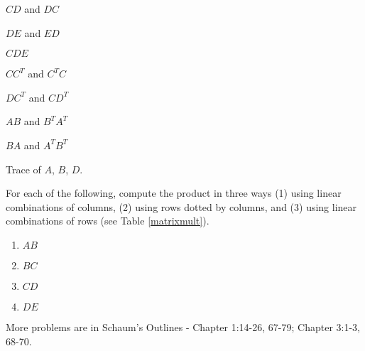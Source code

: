 \begin{enumerate}
\begin{enumerate}
\begin{multicols}{4}
	\item $CD$ and $DC$
	\item $DE$ and $ED$
	\item $CDE$
	\item $CC^T$ and $C^TC$
	\item $DC^T$ and $CD^T$
	\item $AB$ and $B^TA^T$
	\item $BA$ and $A^TB^T$
	\item Trace of $A$, $B$, $D$.	
\end{multicols}
\end{enumerate}
For each of the following, compute the product in three ways (1) using linear combinations of columns, (2) using rows dotted by columns, and (3) using linear combinations of rows (see Table \ref{matrixmult}).
\begin{multicols}{4}
\begin{enumerate}[resume]
\item $AB$
\item $BC$
\item $CD$
\item $DE$
\end{enumerate}
\end{multicols}
More problems are in Schaum's Outlines - 
Chapter 1:14-26, 67-79;
Chapter 3:1-3, 68-70.







\end{enumerate}
